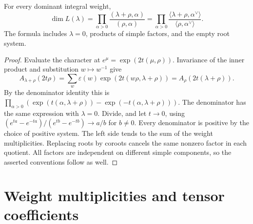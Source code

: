 \begin{corollary}
\label{res:H04}
For every dominant integral weight,
\[
 \dim L(\lambda)
  =\prod_{\alpha>0}\frac{(\lambda+\rho,\alpha)}{(\rho,\alpha)}
  =\prod_{\alpha>0}
       \frac{\langle\lambda+\rho,\alpha^\vee\rangle}
            {\langle\rho,\alpha^\vee\rangle}.
\]
The formula includes \(\lambda=0\), products of simple factors,
and the empty root system.
\end{corollary}
\begin{proof}
Evaluate the character at \(e^\mu=\exp(2t(\mu,\rho))\).
Invariance of the inner product and substitution \(w\mapsto w^{-1}\)
give
\[
 A_{\lambda+\rho}(2t\rho)
  =\sum_w\varepsilon(w)\exp(2t(w\rho,\lambda+\rho))
  =A_\rho(2t(\lambda+\rho)).
\]
By the denominator identity this is
\(\prod_{\alpha>0}
 (\exp(t(\alpha,\lambda+\rho))-\exp(-t(\alpha,\lambda+\rho)))\).
The denominator has the same expression with \(\lambda=0\).
Divide, and let \(t\to0\), using
\((e^{ta}-e^{-ta})/(e^{tb}-e^{-tb})\to a/b\) for \(b\ne0\).
Every denominator is positive by the choice of positive system.
The left side tends to the sum of the weight multiplicities.
Replacing roots by coroots cancels the same nonzero factor in
each quotient. All factors are independent on different simple
components, so the asserted conventions follow as well.
\end{proof}

\section{Weight multiplicities and tensor coefficients}

